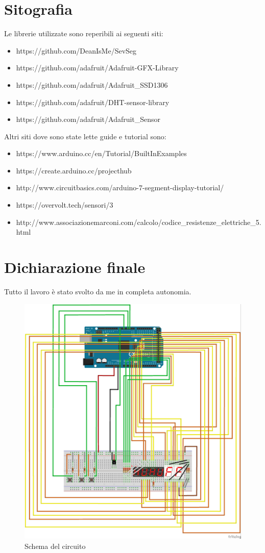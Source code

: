 \documentclass[paper=a4, fontsize=10pt]{scrartcl}
\begin{document}
\section{Sitografia}

Le librerie utilizzate sono reperibili ai seguenti siti:
\begin{itemize}
\item https://github.com/DeanIsMe/SevSeg
\item https://github.com/adafruit/Adafruit-GFX-Library
\item https://github.com/adafruit/Adafruit\_SSD1306
\item https://github.com/adafruit/DHT-sensor-library
\item https://github.com/adafruit/Adafruit\_Sensor
\end{itemize}

Altri siti dove sono state lette guide e tutorial sono:
\begin{itemize}
\item https://www.arduino.cc/en/Tutorial/BuiltInExamples
\item https://create.arduino.cc/projecthub
\item http://www.circuitbasics.com/arduino-7-segment-display-tutorial/
\item https://overvolt.tech/sensori/3
\item http://www.associazionemarconi.com/calcolo/codice\_resistenze\_elettriche\_5.html
\end{itemize}


\section{Dichiarazione finale}
Tutto il lavoro è stato svolto da me in completa autonomia.

\begin{figure}
  \includegraphics[width=\linewidth]{MySchema.jpg}
  \caption{Schema del circuito}
  \label{fig:schema1}
\end{figure}
\end{document}
